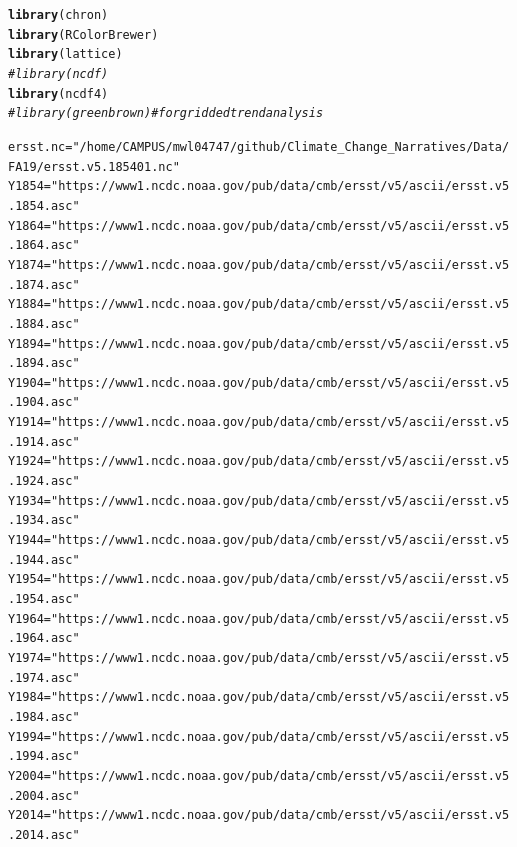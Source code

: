 \documentclass{article}\usepackage[]{graphicx}\usepackage[]{color}
\makeatletter
\newcommand{\hlstr}[1]{\textcolor[rgb]{0.192,0.494,0.8}{#1}}%
\newcommand{\hlcom}[1]{\textcolor[rgb]{0.678,0.584,0.686}{\textit{#1}}}%
\newcommand{\hlstd}[1]{\textcolor[rgb]{0.345,0.345,0.345}{#1}}%
\newcommand{\hlkwb}[1]{\textcolor[rgb]{0.69,0.353,0.396}{#1}}%
\newcommand{\hlkwd}[1]{\textcolor[rgb]{0.737,0.353,0.396}{\textbf{#1}}}%
\newenvironment{kframe}{%
 \def\at@end@of@kframe{}%
 \ifinner\ifhmode%
  \def\at@end@of@kframe{\end{minipage}}%
  \begin{minipage}{\columnwidth}%
 \fi\fi%
 \def\FrameCommand##1{\hskip\@totalleftmargin \hskip-\fboxsep
 \colorbox{shadecolor}{##1}\hskip-\fboxsep
     \hskip-\linewidth \hskip-\@totalleftmargin \hskip\columnwidth}%
 \MakeFramed {\advance\hsize-\width
   \@totalleftmargin\z@ \linewidth\hsize
   \@setminipage}}%
 {\par\unskip\endMakeFramed%
 \at@end@of@kframe}
\newenvironment{knitrout}{}{} %
\makeatother
\begin{document}
\begin{knitrout}
\color{fgcolor}\begin{kframe}
\begin{alltt}
\hlkwd{library}\hlstd{(chron)}
\hlkwd{library}\hlstd{(RColorBrewer)}
\hlkwd{library}\hlstd{(lattice)}
\hlcom{#library(ncdf)}
\hlkwd{library}\hlstd{(ncdf4)}
\hlcom{#library(greenbrown) # for gridded trend analysis}

\hlstd{ersst.nc} \hlkwb{=} \hlstr{"/home/CAMPUS/mwl04747/github/Climate_Change_Narratives/Data/FA19/ersst.v5.185401.nc"}
\hlstd{Y1854} \hlkwb{=} \hlstr{"https://www1.ncdc.noaa.gov/pub/data/cmb/ersst/v5/ascii/ersst.v5.1854.asc"}
\hlstd{Y1864} \hlkwb{=} \hlstr{"https://www1.ncdc.noaa.gov/pub/data/cmb/ersst/v5/ascii/ersst.v5.1864.asc"}
\hlstd{Y1874} \hlkwb{=} \hlstr{"https://www1.ncdc.noaa.gov/pub/data/cmb/ersst/v5/ascii/ersst.v5.1874.asc"}
\hlstd{Y1884} \hlkwb{=} \hlstr{"https://www1.ncdc.noaa.gov/pub/data/cmb/ersst/v5/ascii/ersst.v5.1884.asc"}
\hlstd{Y1894} \hlkwb{=} \hlstr{"https://www1.ncdc.noaa.gov/pub/data/cmb/ersst/v5/ascii/ersst.v5.1894.asc"}
\hlstd{Y1904} \hlkwb{=} \hlstr{"https://www1.ncdc.noaa.gov/pub/data/cmb/ersst/v5/ascii/ersst.v5.1904.asc"}
\hlstd{Y1914} \hlkwb{=} \hlstr{"https://www1.ncdc.noaa.gov/pub/data/cmb/ersst/v5/ascii/ersst.v5.1914.asc"}
\hlstd{Y1924} \hlkwb{=} \hlstr{"https://www1.ncdc.noaa.gov/pub/data/cmb/ersst/v5/ascii/ersst.v5.1924.asc"}
\hlstd{Y1934} \hlkwb{=} \hlstr{"https://www1.ncdc.noaa.gov/pub/data/cmb/ersst/v5/ascii/ersst.v5.1934.asc"}
\hlstd{Y1944} \hlkwb{=} \hlstr{"https://www1.ncdc.noaa.gov/pub/data/cmb/ersst/v5/ascii/ersst.v5.1944.asc"}
\hlstd{Y1954} \hlkwb{=} \hlstr{"https://www1.ncdc.noaa.gov/pub/data/cmb/ersst/v5/ascii/ersst.v5.1954.asc"}
\hlstd{Y1964} \hlkwb{=} \hlstr{"https://www1.ncdc.noaa.gov/pub/data/cmb/ersst/v5/ascii/ersst.v5.1964.asc"}
\hlstd{Y1974} \hlkwb{=} \hlstr{"https://www1.ncdc.noaa.gov/pub/data/cmb/ersst/v5/ascii/ersst.v5.1974.asc"}
\hlstd{Y1984} \hlkwb{=} \hlstr{"https://www1.ncdc.noaa.gov/pub/data/cmb/ersst/v5/ascii/ersst.v5.1984.asc"}
\hlstd{Y1994} \hlkwb{=} \hlstr{"https://www1.ncdc.noaa.gov/pub/data/cmb/ersst/v5/ascii/ersst.v5.1994.asc"}
\hlstd{Y2004} \hlkwb{=} \hlstr{"https://www1.ncdc.noaa.gov/pub/data/cmb/ersst/v5/ascii/ersst.v5.2004.asc"}
\hlstd{Y2014} \hlkwb{=} \hlstr{"https://www1.ncdc.noaa.gov/pub/data/cmb/ersst/v5/ascii/ersst.v5.2014.asc"}


\end{alltt}
\end{kframe}
\end{knitrout}
\end{document}
